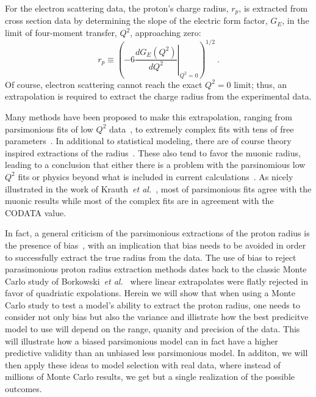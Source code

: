 \documentclass[10pt,aps,prc,twocolumn]{revtex4-1}
\begin{document}
For the electron scattering data, the proton's charge radius, $r_p$, is extracted from
cross section data by determining the slope of the electric form factor, $G_E$, in the
limit of four-moment transfer, $Q^2$, approaching zero: 
\begin{equation}
\label{eq:radius}
  r_p \equiv %
    \left( -6  \left. \frac{dG_E(Q^2)}{dQ^2}
    \right|_{Q^{2}=0} \right)^{1/2} \>.
\end{equation}
Of course, electron scattering cannot reach the exact $Q^2 = 0$ limit; thus,
an extrapolation is required to extract the charge radius from the experimental data.

Many methods have been proposed to make this extrapolation,
ranging from parsimonious fits of low $Q^2$ data~\cite{Rosenfelder:1999cd,Griffioen:2015hta,Horbatsch:2015qda,Higinbotham:2015rja},
to extremely complex fits with tens of free parameters~\cite{Bernauer:2013tpr,Lee:2015jqa}.
In additional to statistical modeling, there are of course 
theory inspired extractions of the radius~\cite{Belushkin:2006qa,Horbatsch:2016ilr}.   These also tend to favor the 
muonic radius, leading to a conclusion that either there is a problem with the parsinomious low $Q^2$ fits or physics beyond
what is included in current calculations~\cite{Carlson:2015jba,Liu:2016qwd}.
As nicely illustrated in the work of Krauth~{\it{et al.}}~\cite{Krauth:2017ijq}, most of 
parsimonious fits agree with the muonic results while most of the complex fits 
are in agreement with the CODATA value.   


In fact, a general criticism of the parsimonious extractions of the proton radius is the presence of bias~\cite{Sick:2017aor,Sick:2018fzn},
with an implication that bias needs to be avoided in order to successfully extract the true radius from the data.
The use of bias to reject parasimonious proton radius extraction methods dates back to the classic Monte Carlo 
study of Borkowski~{\it{et al.}}~\cite{Borkowski:1975} where linear extrapolates were flatly rejected in favor of quadriatic
expolations.  Herein we will show that when using a Monte Carlo study to test a model's ability
to extract the proton radius, one needs to consider not only bias but also the variance and illistrate how 
the best predicitve model to use will depend on the range, quanity and precision of the data.
This will illustrate how a biased parsimonious model can in fact have a higher predictive 
validity than an unbiased less parsimonious model.   In additon, we will then apply these ideas to model selection with real
data, where instead of millions of Monte Carlo results, we get but a single realization of the possible outcomes.  
\end{document}

